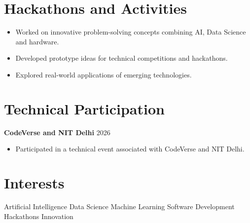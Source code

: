 \documentclass[11pt,a4paper]{article}
\begin{document}
\section*{Hackathons and Activities}

\begin{itemize}

    \item Worked on innovative problem-solving
    concepts combining AI, Data Science and hardware.

    \item Developed prototype ideas for technical
    competitions and hackathons.

    \item Explored real-world applications of
    emerging technologies.

\end{itemize}


\section*{Technical Participation}

\textbf{CodeVerse and NIT Delhi}
\hfill
2026

\begin{itemize}

    \item Participated in a technical event
    associated with CodeVerse and NIT Delhi.

\end{itemize}


\section*{Interests}

Artificial Intelligence \quad
Data Science \quad
Machine Learning \quad
Software Development \quad
Hackathons \quad
Innovation

\end{document}
